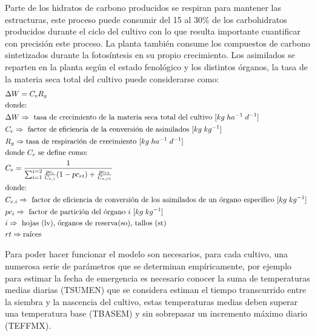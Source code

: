 \begin{enumerate}
	Parte de los hidratos de carbono producidos se respiran para mantener las estructuras, este proceso puede consumir del 15 al 30\% de los carbohidratos producidos durante el ciclo del cultivo con lo que resulta importante cuantificar con precisión este proceso. La planta también consume los compuestos de carbono sintetizados durante la fotosíntesis en su propio crecimiento. Los asimilados se reparten en la planta según el estado fenológico y los distintos órganos, la tasa de la materia seca total del cultivo puede considerarse como:
	\begin{align*}
		&\Delta W = C_e R_g\\
		&\text{donde: } \\
		&\Delta W  \Rightarrow \text{ tasa de crecimiento de la materia seca total del cultivo [$ kg \; ha^{-1} \; d^{-1} $] } \\
		&C_e  \Rightarrow \text{ factor de eficiencia de la conversión de asimilados [$ kg \; kg^{-1} $] } \\
		&R_g \Rightarrow \text{tasa de respiración de crecimiento [$ kg \; ha^{-1} \; d^{-1} $] } \\
		&\text{donde $ C_e $ se define como: } \\ 
		&C_e = \frac{1}{\sum_{i=1}^{i=2}\frac{pc_i}{C_{e,i}}(1-pc_{rt})+\frac{pc_{rt}}{C_{e,rt}} } \\
		&\text{donde: } \\
		& C_{e,i}  \Rightarrow \text{ factor de eficiencia de conversión de los asimilados de un órgano específico [$ kg \; kg^{-1} $] } \\
		& pc_i  \Rightarrow \text{ factor de partición del órgano $ i $ [$ kg \; kg^{-1} $] } \\
		& i \Rightarrow \text{ hojas (lv), órganos de reserva(so), tallos (st) } \\
		& rt \Rightarrow \text{raíces}
	\end{align*}
	
	Para poder hacer funcionar el modelo son necesarios, para cada cultivo, una numerosa serie de parámetros que se determinan empíricamente, por ejemplo para estimar la fecha de emergencia es necesario conocer la suma de temperaturas medias diarias (TSUMEN) que se considera estiman el tiempo transcurrido entre la siembra y la nascencia del cultivo, estas temperaturas medias deben superar una temperatura base (TBASEM) y sin sobrepasar un incremento máximo diario (TEFFMX). 
	
\end{enumerate}


